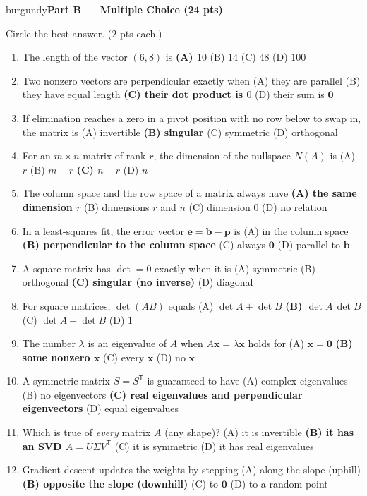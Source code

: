 \documentclass[10pt]{article}
\newcommand{\xx}{\mathbf{x}}
\newcommand{\bb}{\mathbf{b}}
\newcommand{\pp}{\mathbf{p}}
\newcommand{\ee}{\mathbf{e}}
\newcommand{\zero}{\mathbf{0}}
\newcommand{\T}{\mathsf{T}}
\newcommand{\parthead}[1]{%
  \vspace{6pt}\noindent
  \begin{headlinebox}{burgundy}{\color{white}\bfseries #1}\end{headlinebox}%
  \vspace{4pt}}
\begin{document}
\parthead{Part B --- Multiple Choice (24 pts)}
Circle the best answer. ($2$ pts each.)

\begin{enumerate}[leftmargin=1.9em, itemsep=8pt]
  \item The length of the vector $(6,8)$ is
    \hfill \textbf{(A) $10$} \ans{$\leftarrow$} \quad (B) $14$ \quad (C) $48$ \quad (D) $100$
  \item Two nonzero vectors are perpendicular exactly when
    \hfill (A) they are parallel \quad (B) they have equal length \quad \textbf{(C) their dot product is $0$} \ans{$\leftarrow$} \quad (D) their sum is $\zero$
  \item If elimination reaches a zero in a pivot position with no row below to swap in, the matrix is
    \hfill (A) invertible \quad \textbf{(B) singular} \ans{$\leftarrow$} \quad (C) symmetric \quad (D) orthogonal
  \item For an $m\times n$ matrix of rank $r$, the dimension of the nullspace $N(A)$ is
    \hfill (A) $r$ \quad (B) $m-r$ \quad \textbf{(C) $n-r$} \ans{$\leftarrow$} \quad (D) $n$
  \item The column space and the row space of a matrix always have
    \hfill \textbf{(A) the same dimension $r$} \ans{$\leftarrow$} \quad (B) dimensions $r$ and $n$ \quad (C) dimension $0$ \quad (D) no relation
  \item In a least-squares fit, the error vector $\ee=\bb-\pp$ is
    \hfill (A) in the column space \quad \textbf{(B) perpendicular to the column space} \ans{$\leftarrow$} \quad (C) always $\zero$ \quad (D) parallel to $\bb$
  \item A square matrix has $\det=0$ exactly when it is
    \hfill (A) symmetric \quad (B) orthogonal \quad \textbf{(C) singular (no inverse)} \ans{$\leftarrow$} \quad (D) diagonal
  \item For square matrices, $\det(AB)$ equals
    \hfill (A) $\det A+\det B$ \quad \textbf{(B) $\det A\,\det B$} \ans{$\leftarrow$} \quad (C) $\det A-\det B$ \quad (D) $1$
  \item The number $\lambda$ is an eigenvalue of $A$ when $A\xx=\lambda\xx$ holds for
    \hfill (A) $\xx=\zero$ \quad \textbf{(B) some nonzero $\xx$} \ans{$\leftarrow$} \quad (C) every $\xx$ \quad (D) no $\xx$
  \item A symmetric matrix $S=S^\T$ is guaranteed to have
    \hfill (A) complex eigenvalues \quad (B) no eigenvectors \quad \textbf{(C) real eigenvalues and perpendicular eigenvectors} \ans{$\leftarrow$} \quad (D) equal eigenvalues
  \item Which is true of \emph{every} matrix $A$ (any shape)?
    \hfill (A) it is invertible \quad \textbf{(B) it has an SVD $A=U\Sigma V^\T$} \ans{$\leftarrow$} \quad (C) it is symmetric \quad (D) it has real eigenvalues
  \item Gradient descent updates the weights by stepping
    \hfill (A) along the slope (uphill) \quad \textbf{(B) opposite the slope (downhill)} \ans{$\leftarrow$} \quad (C) to $\zero$ \quad (D) to a random point
\end{enumerate}
\end{document}
